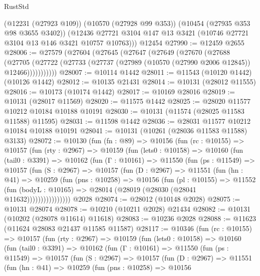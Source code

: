 \begin{lexlean}{RustStd}
\begin{coremodule}
      (@12231 (@27923 @109))
      (@10570 (@27928 @99 @353))
      (@10454 (@27935 @353 @98 @3655 @3402))
      (@12436 @27721 @3104 @147 @13 @3421 (@10746 @27721 @3104 @13 @146 @3421 @10757 @10763)))
    @12454
@27990 := @12459 @2655
@28006 := @27579
    (@27604
      (@27645
        (@27647
          (@27649
            (@27670
              (@27688
                (@27705
                  (@27722 (@27733 (@27737 (@27989 (@10570 (@27990 @2006 @12845)) @12466)))))))))))
@28007 := @10114 @1442
@28011 := @11543 (@10120 @1442) (@10126 @1442)
@28012 := @10135 @21431
@28014 := @10131 (@28012 @11555)
@28016 := @10173 (@10174 @1442)
@28017 := @10169 @28016
@28019 := @10131 (@28017 @11569)
@28020 := @11575 @1442
@28025 := @28020 @11577 @10212 @10184 @10188 @10191
@28030 := @10131 (@11574 (@28025 @11583 @11588) @11595)
@28031 := @11598 @1442
@28036 := @28031 @11577 @10212 @10184 @10188 @10191
@28041 := @10131 (@10261 (@28036 @11583 @11588) @3133)
@28072 := @10130
    (fun (fn : @89) =>
    @10156
      (fun (rc : @10155) =>
      @10157
        (fun (rty : @2967) =>
        @10159
          (fun (lets0 : @10158) =>
          @10160
            (fun (tail0 : @3391) =>
            @10162
              (fun (Γ : @10161) =>
              @11550
                (fun (ps : @11549) =>
                @10157
                  (fun (S : @2967) =>
                  @10157
                    (fun (D : @2967) =>
                    @11551
                      (fun (hn : @41) =>
                      @10259
                        (fun (pns : @10258) =>
                        @10156
                          (fun (pl : @10155) =>
                          @11552
                            (fun (bodyL : @10165) =>
                            @28014 (@28019 (@28030 (@28041 @11632))))))))))))))))
    @2028
@28074 := @28012 (@10148 @2028)
@28075 := @10131 @28074
@28078 := @10210 (@10211 @2028) @21434
@28082 := @10131 (@10202 (@28078 @11614) @11618)
@28083 := @10236 @2028
@28088 := @11623 (@11624 @28083 @21437 @11585 @11587)
@28117 := @10346
    (fun (rc : @10155) =>
    @10157
      (fun (rty : @2967) =>
      @10159
        (fun (lets0 : @10158) =>
        @10160
          (fun (tail0 : @3391) =>
          @10162
            (fun (Γ : @10161) =>
            @11550
              (fun (ps : @11549) =>
              @10157
                (fun (S : @2967) =>
                @10157
                  (fun (D : @2967) =>
                  @11551
                    (fun (hn : @41) =>
                    @10259
                      (fun (pns : @10258) =>
                      @10156

\end{coremodule}
\end{lexlean}
